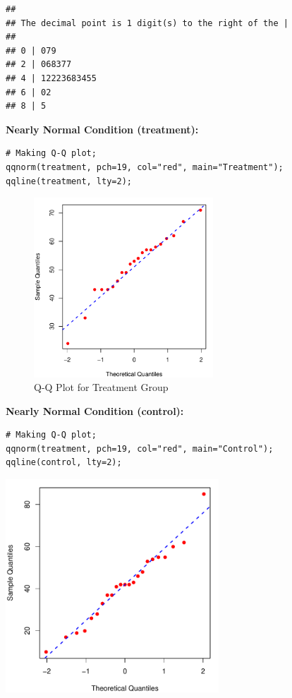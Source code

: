 \begin{example}
\begin{tcolorbox}[colback=gray!10, colframe=black!45, arc=2mm, before skip=4pt, after skip=4pt]
\begin{verbatim}
##
## The decimal point is 1 digit(s) to the right of the |
##
## 0 | 079
## 2 | 068377
## 4 | 12223683455
## 6 | 02
## 8 | 5
\end{verbatim}
\end{tcolorbox}
\noindent\textbf{Nearly Normal Condition (treatment):}
\begin{tcolorbox}[colback=gray!10, colframe=black!45, arc=2mm, before skip=4pt, after skip=4pt]
\begin{verbatim}
# Making Q-Q plot;
qqnorm(treatment, pch=19, col="red", main="Treatment");
qqline(treatment, lty=2);
\end{verbatim}
\end{tcolorbox}
\begin{figure}[H]
\centering
\includegraphics[width=0.6\textwidth]{section14/images/treatment_qqplot.pdf}
\caption{Q-Q Plot for Treatment Group}
\label{fig:qqplot-ggplot}
\end{figure}
\noindent\textbf{Nearly Normal Condition (control):}
\begin{tcolorbox}[colback=gray!10, colframe=black!45, arc=2mm, before skip=4pt, after skip=4pt]
\begin{verbatim}
# Making Q-Q plot;
qqnorm(treatment, pch=19, col="red", main="Control");
qqline(control, lty=2);
\end{verbatim}
\end{tcolorbox}
\noindent
\begin{minipage}{\textwidth}
\centering
\includegraphics[width=0.6\textwidth]{section14/images/control_qqplot.pdf}

\end{minipage}
\end{example}
